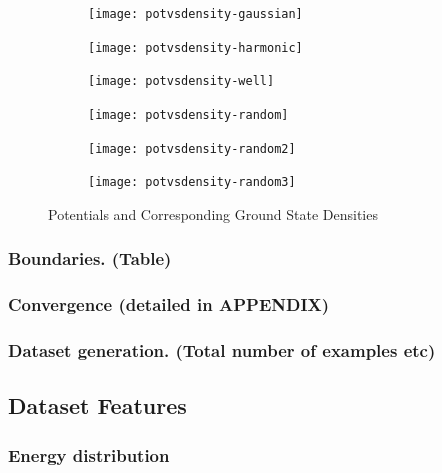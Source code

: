 \documentclass[a4paper,times,hidelinks,12pt]{article}
\begin{document}
\graphicspath{{"../figs/potentials/"}}
\begin{figure}[H]
    \centering
    \begin{subfigure}[t]{0.45\textwidth}
        \texttt{[image: potvsdensity-gaussian]}
    \end{subfigure}
    \begin{subfigure}[t]{0.45\textwidth}
        \texttt{[image: potvsdensity-harmonic]}
    \end{subfigure}
    \begin{subfigure}[t]{0.45\textwidth}
        \texttt{[image: potvsdensity-well]}
    \end{subfigure}
    \begin{subfigure}[t]{0.45\textwidth}
        \texttt{[image: potvsdensity-random]}
    \end{subfigure}
    \begin{subfigure}[t]{0.45\textwidth}
        \texttt{[image: potvsdensity-random2]}
    \end{subfigure}
    \begin{subfigure}[t]{0.45\textwidth}
        \texttt{[image: potvsdensity-random3]}
    \end{subfigure}
\caption{Potentials and Corresponding Ground State Densities}
\label{fig:random3_before_after}
\end{figure}





\subsubsection{Boundaries. (Table)}
\subsubsection{Convergence (detailed in APPENDIX)}
\subsubsection{Dataset generation. (Total number of examples etc)}

\subsection{Dataset Features}
\subsubsection{Energy distribution}
\end{document}
